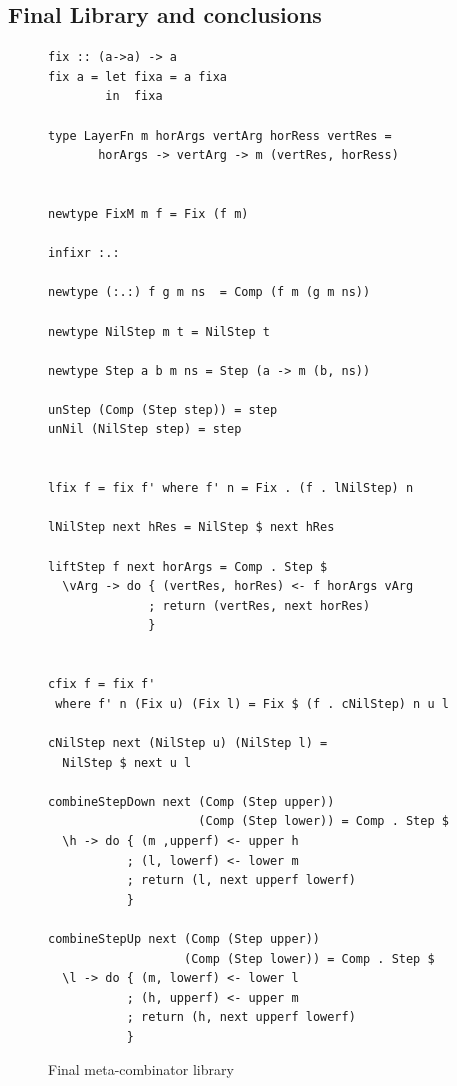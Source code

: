 \documentclass[preprint,natbib]{sigplanconf}
\begin{document}
%																
\subsection{Final Library and conclusions} \label{sect:libAndConclusions}

\begin{figure}
\begin{small}
\begin{center}
\begin{footnotesize}
\begin{verbatim}
fix :: (a->a) -> a
fix a = let fixa = a fixa
        in  fixa

type LayerFn m horArgs vertArg horRess vertRes =
       horArgs -> vertArg -> m (vertRes, horRess)


newtype FixM m f = Fix (f m)

infixr :.:

newtype (:.:) f g m ns  = Comp (f m (g m ns))

newtype NilStep m t = NilStep t

newtype Step a b m ns = Step (a -> m (b, ns))

unStep (Comp (Step step)) = step
unNil (NilStep step) = step


lfix f = fix f' where f' n = Fix . (f . lNilStep) n

lNilStep next hRes = NilStep $ next hRes

liftStep f next horArgs = Comp . Step $ 
  \vArg -> do { (vertRes, horRes) <- f horArgs vArg
              ; return (vertRes, next horRes)
              }
              

cfix f = fix f' 
 where f' n (Fix u) (Fix l) = Fix $ (f . cNilStep) n u l

cNilStep next (NilStep u) (NilStep l) = 
  NilStep $ next u l

combineStepDown next (Comp (Step upper)) 
                     (Comp (Step lower)) = Comp . Step $
  \h -> do { (m ,upperf) <- upper h
           ; (l, lowerf) <- lower m
           ; return (l, next upperf lowerf)   
           }

combineStepUp next (Comp (Step upper)) 
                   (Comp (Step lower)) = Comp . Step $
  \l -> do { (m, lowerf) <- lower l
           ; (h, upperf) <- upper m
           ; return (h, next upperf lowerf)
           }
\end{verbatim} %
\end{footnotesize}\caption{Final meta-combinator library}\label{fig:metacombinators} 
\end{center}
\end{small}
\end{figure}
\end{document}
